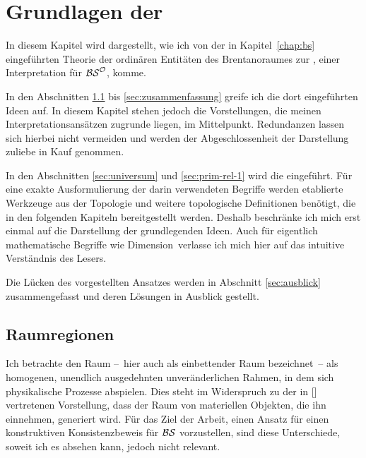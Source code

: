 \chapter{Grundlagen der \strukt}\label{chap:bso-grundideen}

    In diesem Kapitel wird dargestellt, wie ich von der in Kapitel~\ref{chap:bs} eingeführten Theorie der ordinären Entitäten des Brentanoraumes zur \strukt, einer Interpretation für $\mathcal{BS}^{\mathcal{O}}$, komme.

    In den Abschnitten \ref{sec:raumreg} bis \ref{sec:zusammenfassung} greife ich die dort eingeführten Ideen auf. In diesem Kapitel stehen jedoch die Vorstellungen, die meinen Interpretationsansätzen zugrunde liegen, im Mittelpunkt. Redundanzen lassen sich hierbei nicht vermeiden und werden der Abgeschlossenheit der Darstellung zuliebe in Kauf genommen.

    In den Abschnitten \ref{sec:universum} und \ref{sec:prim-rel-1} wird die \strukt eingeführt.
    Für eine exakte Ausformulierung der darin verwendeten Begriffe werden etablierte Werkzeuge aus der Topologie und weitere topologische Definitionen benötigt, die in den folgenden Kapiteln bereitgestellt werden.
    Deshalb beschränke ich mich erst einmal auf die Darstellung der grundlegenden Ideen.
    Auch für eigentlich mathematische Begriffe wie \glqq Dimension\grqq\ verlasse ich mich hier auf das intuitive Verständnis des Lesers.

    Die Lücken des vorgestellten Ansatzes werden in Abschnitt \ref{sec:ausblick} zusammengefasst und deren Lösungen in Ausblick gestellt.

    \section{Raumregionen}\label{sec:raumreg}
        Ich betrachte den Raum --~hier auch als einbettender Raum bezeichnet~-- als homogenen, unendlich ausgedehnten unveränderlichen Rahmen, in dem sich physikalische Prozesse abspielen.
        Dies steht im Widerspruch zu der in [\cite{baumann-r-2016-53-a}] vertretenen Vorstellung, dass der Raum von materiellen Objekten, die ihn einnehmen, generiert wird.
        Für das Ziel der Arbeit, einen Ansatz für einen konstruktiven Konsistenzbeweis für $\mathcal{BS}$ vorzustellen, sind diese Unterschiede, soweit ich es absehen kann, jedoch nicht relevant.

